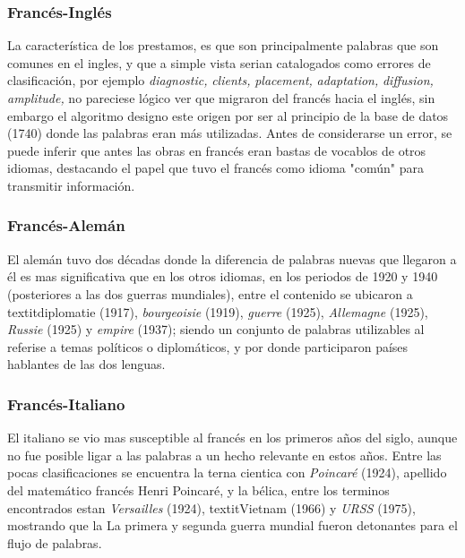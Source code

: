 \subsubsection*{Francés-Inglés}%

La característica de los prestamos, es que son principalmente palabras que son comunes en el ingles, y que a simple vista serian catalogados como errores de clasificación, por ejemplo  \textit{diagnostic,} \textit{clients,} \textit{placement,} \textit{adaptation,} \textit{diffusion,} \textit{amplitude,} no pareciese lógico ver que migraron del francés hacia el inglés, sin embargo el algoritmo designo este origen por ser al principio de la base de datos (1740)  donde las palabras eran más utilizadas.  Antes de considerarse un error, se puede inferir que antes las obras en francés eran bastas de vocablos de otros idiomas, destacando el papel que tuvo el francés como idioma "común" para transmitir información. 


\subsubsection*{Francés-Alemán}%

El alemán tuvo dos décadas donde la diferencia de palabras nuevas que llegaron a él es mas significativa que en los otros idiomas, en los periodos de 1920 y 1940  (posteriores a las dos guerras mundiales), entre el contenido se ubicaron a  textit{diplomatie} (1917), \textit{bourgeoisie} (1919),  \textit{guerre} (1925), \textit{Allemagne} (1925), \textit{Russie} (1925) y \textit{empire} (1937); siendo un conjunto de palabras utilizables al referise a temas políticos  o diplomáticos, y por donde participaron países hablantes de las dos lenguas. 


\subsubsection*{Francés-Italiano}%

El italiano se vio mas susceptible al francés en los primeros años del siglo, aunque no fue posible ligar a las palabras a un hecho relevante en estos años. Entre las pocas clasificaciones se encuentra la terna cientica con \textit{Poincaré} (1924), apellido del matemático francés Henri Poincaré, y la bélica,  entre los terminos encontrados estan \textit{Versailles} (1924), textit{Vietnam} (1966)  y \textit{URSS} (1975), mostrando que la  La primera y segunda guerra mundial fueron detonantes para el flujo de palabras.


